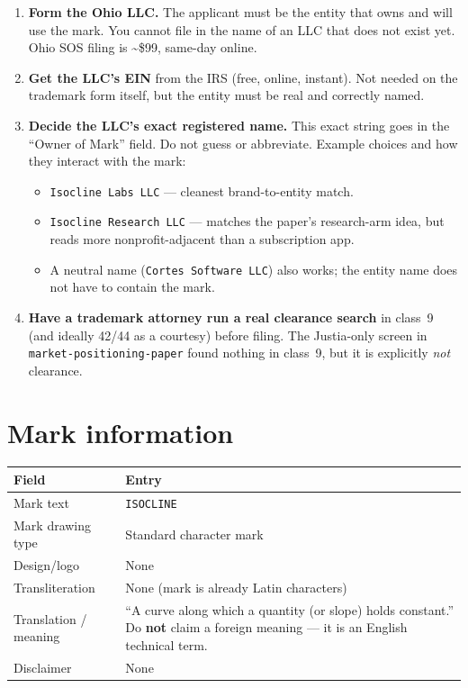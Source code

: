 \documentclass[11pt,a4paper]{article}
\newcommand{\code}[1]{\texttt{\small #1}}
\begin{document}
\begin{enumerate}[leftmargin=1.6em,itemsep=0.2em]
\item \textbf{Form the Ohio LLC.} The applicant must be the entity that owns
      and will use the mark. You cannot file in the name of an LLC that does
      not exist yet. Ohio SOS filing is \textasciitilde\$99, same-day online.
\item \textbf{Get the LLC's EIN} from the IRS (free, online, instant). Not
      needed on the trademark form itself, but the entity must be real and
      correctly named.
\item \textbf{Decide the LLC's exact registered name.} This exact string goes
      in the ``Owner of Mark'' field. Do not guess or abbreviate. Example
      choices and how they interact with the mark:
      \begin{itemize}[leftmargin=1.4em,itemsep=0.1em]
      \item \code{Isocline Labs LLC} --- cleanest brand-to-entity match.
      \item \code{Isocline Research LLC} --- matches the paper's research-arm
            idea, but reads more nonprofit-adjacent than a subscription app.
      \item A neutral name (\code{Cortes Software LLC}) also works; the entity
            name does not have to contain the mark.
      \end{itemize}
\item \textbf{Have a trademark attorney run a real clearance search} in
      class~9 (and ideally 42/44 as a courtesy) before filing. The Justia-only
      screen in \code{market-positioning-paper} found nothing in class~9, but
      it is explicitly \emph{not} clearance.
\end{enumerate}

\section{Mark information}

\begin{center}
\begin{tabular}{@{}L{4.4cm}L{11.6cm}@{}}
\toprule
\textbf{Field} & \textbf{Entry} \\
\midrule
Mark text & \code{ISOCLINE} \\
Mark drawing type & Standard character mark \\
Design/logo & None \\
Transliteration & None (mark is already Latin characters) \\
Translation / meaning & ``A curve along which a quantity (or slope) holds
constant.'' Do \textbf{not} claim a foreign meaning --- it is an English
technical term. \\
Disclaimer & None \\
\bottomrule
\end{tabular}
\end{center}
\end{document}
